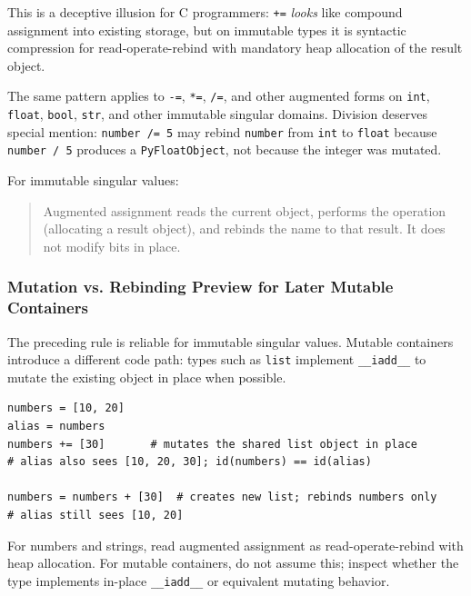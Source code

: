 This is a deceptive illusion for C programmers: \texttt{+=} \emph{looks} like compound assignment into existing storage, but on immutable types it is syntactic compression for read-operate-rebind with mandatory heap allocation of the result object.

The same pattern applies to \texttt{-=}, \texttt{*=}, \texttt{/=}, and other augmented forms on \texttt{int}, \texttt{float}, \texttt{bool}, \texttt{str}, and other immutable singular domains. Division deserves special mention: \texttt{number /= 5} may rebind \texttt{number} from \texttt{int} to \texttt{float} because \texttt{number / 5} produces a \texttt{PyFloatObject}, not because the integer was mutated.

For immutable singular values:

\begin{quote}
Augmented assignment reads the current object, performs the operation (allocating a result object), and rebinds the name to that result. It does not modify bits in place.
\end{quote}

\subsubsection{Mutation vs. Rebinding Preview for Later Mutable Containers}

The preceding rule is reliable for immutable singular values. Mutable containers introduce a different code path: types such as \texttt{list} implement \texttt{\_\_iadd\_\_} to mutate the existing object in place when possible.

\begin{verbatim}
numbers = [10, 20]
alias = numbers
numbers += [30]       # mutates the shared list object in place
# alias also sees [10, 20, 30]; id(numbers) == id(alias)

numbers = numbers + [30]  # creates new list; rebinds numbers only
# alias still sees [10, 20]
\end{verbatim}

For numbers and strings, read augmented assignment as read-operate-rebind with heap allocation. For mutable containers, do not assume this; inspect whether the type implements in-place \texttt{\_\_iadd\_\_} or equivalent mutating behavior.
